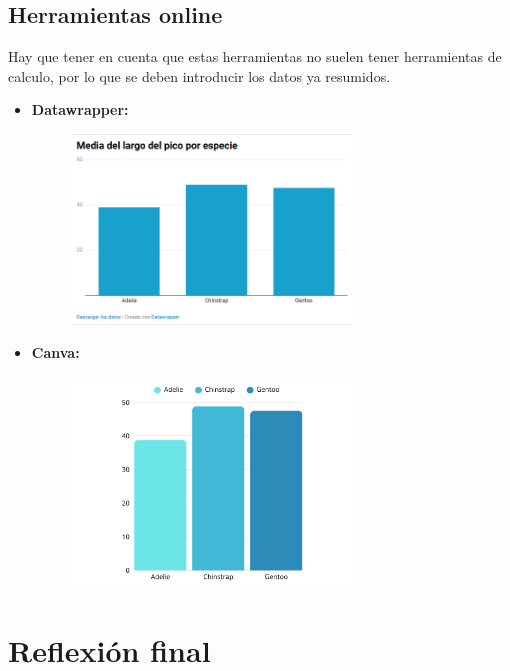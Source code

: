\documentclass{../../miPlantilla}
\begin{document}
\subsection{Herramientas online}
Hay que tener en cuenta que estas herramientas no suelen tener herramientas de calculo, por lo que se deben introducir los datos ya resumidos.
\begin{itemize}
    \item \textbf{Datawrapper:}
    \begin{figure}[H]
        \centering
        \includegraphics[width=0.7\textwidth]{5.png}
    \end{figure}

    \item \textbf{Canva:}
    \begin{figure}[H]
        \centering
        \includegraphics[width=0.7\textwidth]{6.png}
    \end{figure}
\end{itemize}

\newpage

\section{Reflexión final}
\end{document}
